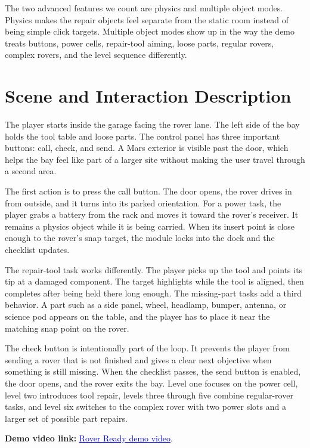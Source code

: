 \documentclass[conference]{IEEEtran}
\begin{document}
The two advanced features we count are physics and multiple object modes.
Physics makes the repair objects feel separate from the static room instead of
being simple click targets. Multiple object modes show up in the way the demo
treats buttons, power cells, repair-tool aiming, loose parts, regular rovers,
complex rovers, and the level sequence differently.

\section{Scene and Interaction Description}

The player starts inside the garage facing the rover lane. The left side of the
bay holds the tool table and loose parts. The control panel has three important
buttons: call, check, and send. A Mars exterior is visible past the door, which
helps the bay feel like part of a larger site without making the user travel
through a second area.

The first action is to press the call button. The door opens, the rover drives
in from outside, and it turns into its parked orientation. For a power task, the
player grabs a battery from the rack and moves it toward the rover's receiver.
It remains a physics object while it is being carried. When its insert point is
close enough to the rover's snap target, the module locks into the dock and the
checklist updates.

The repair-tool task works differently. The player picks up the tool and points
its tip at a damaged component. The target highlights while the tool is aligned,
then completes after being held there long enough. The missing-part tasks add a
third behavior. A part such as a side panel, wheel, headlamp, bumper, antenna,
or science pod appears on the table, and the player has to place it near the
matching snap point on the rover.

The check button is intentionally part of the loop. It prevents the player from
sending a rover that is not finished and gives a clear next objective when
something is still missing. When the checklist passes, the send button is
enabled, the door opens, and the rover exits the bay. Level one focuses on the
power cell, level two introduces tool repair, levels three through five combine
regular-rover tasks, and level six switches to the complex rover with two power
slots and a larger set of possible part repairs.

\noindent\textbf{Demo video link:}
\href{https://drive.google.com/file/d/181-qk8FlxVFiz2XKqnIYf50mEGy6T0m4/view}{\textcolor{blue}{\underline{Rover Ready demo video}}}.
\end{document}
